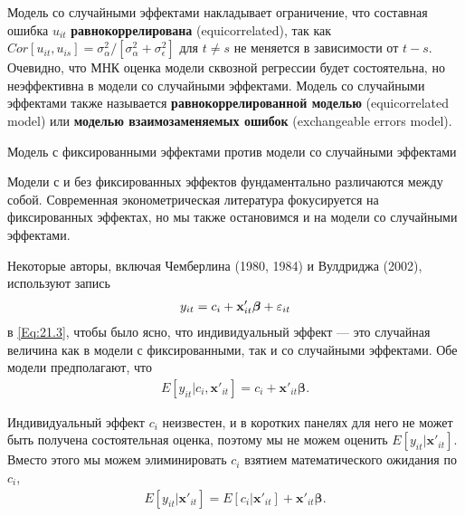 Модель со случайными эффектами накладывает ограничение, что составная ошибка $u_{it}$ \textbf{равнокоррелирована} (equicorrelated), так как $Cor[u_{it},u_{is}]=\sigma^2_{\alpha}/[\sigma^2_{\alpha} + \sigma^2_{\epsilon}]$ для $t\neq s$ не меняется в зависимости от $t-s$. Очевидно, что МНК оценка модели сквозной регрессии будет состоятельна, но неэффективна в модели со случайными эффектами. Модель со случайными эффектами также называется \textbf{равнокоррелированной моделью} (equicorrelated model) или \textbf{моделью взаимозаменяемых ошибок} (exchangeable errors model).

{\centering
Модель с фиксированными эффектами против модели со случайными эффектами\\}

Модели с и без фиксированных эффектов фундаментально различаются между собой. Современная эконометрическая литература фокусируется на фиксированных эффектах, но мы также остановимся и на модели со случайными эффектами.

Некоторые авторы, включая Чемберлина (1980, 1984) и  Вулдриджа (2002), используют запись
\begin{align}
y_{it} = c_i + \mathbf x'_{it} \bm{\beta} + \varepsilon_{it}
\nonumber
\end{align}
в \ref{Eq:21.3}, чтобы было ясно, что индивидуальный эффект --- это случайная величина как в модели с фиксированными, так и со случайными эффектами. Обе модели предполагают, что
\begin{align}
E[y_{it} | c_i,  \mathbf x'_{it}] = c_i +  \mathbf x'_{it} \bm{\beta}.
\nonumber
\end{align}

Индивидуальный эффект $c_i$ неизвестен, и  в коротких панелях для него не может быть получена состоятельная оценка, поэтому мы не можем оценить $E[y_{it} | \mathbf x'_{it}]$. Вместо этого мы можем элиминировать $c_i$ взятием математического ожидания по $c_i$, 
\begin{align}
E[y_{it} | \mathbf x'_{it}] = E [c_i | \mathbf x'_{it}] + \mathbf x'_{it} \bm{\beta}\nonumber.
\end{align}

